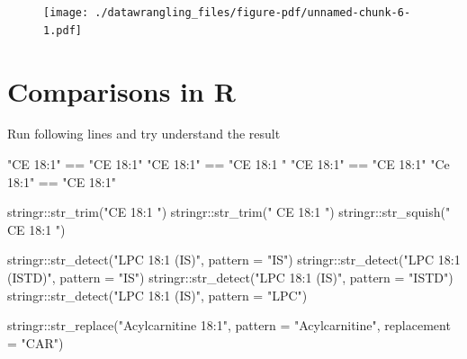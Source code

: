 \documentclass[
  letterpaper,
  DIV=11,
  numbers=noendperiod]{scrreprt}
\newenvironment{Shaded}{\begin{snugshade}}{\end{snugshade}}
\newcommand{\AttributeTok}[1]{\textcolor[rgb]{0.40,0.45,0.13}{#1}}
\newcommand{\FunctionTok}[1]{\textcolor[rgb]{0.28,0.35,0.67}{#1}}
\newcommand{\NormalTok}[1]{\textcolor[rgb]{0.00,0.23,0.31}{#1}}
\newcommand{\SpecialCharTok}[1]{\textcolor[rgb]{0.37,0.37,0.37}{#1}}
\newcommand{\StringTok}[1]{\textcolor[rgb]{0.13,0.47,0.30}{#1}}
\begin{document}
\begin{figure}[H]

{\centering \texttt{[image: ./datawrangling\_files/figure-pdf/unnamed-chunk-6-1.pdf]}

}

\end{figure}

\hypertarget{comparisons-in-r}{%
\section{Comparisons in R}\label{comparisons-in-r}}

Run following lines and try understand the result

\begin{Shaded}
\begin{Highlighting}[]
\StringTok{"CE 18:1"} \SpecialCharTok{==} \StringTok{"CE 18:1"}
\StringTok{"CE 18:1"} \SpecialCharTok{==} \StringTok{"CE 18:1 "}
\StringTok{"CE 18:1"} \SpecialCharTok{==} \StringTok{"CE  18:1"}
\StringTok{"Ce 18:1"} \SpecialCharTok{==} \StringTok{"CE 18:1"}

\NormalTok{stringr}\SpecialCharTok{::}\FunctionTok{str\_trim}\NormalTok{(}\StringTok{"CE 18:1 "}\NormalTok{)}
\NormalTok{stringr}\SpecialCharTok{::}\FunctionTok{str\_trim}\NormalTok{(}\StringTok{"   CE    18:1 "}\NormalTok{)}
\NormalTok{stringr}\SpecialCharTok{::}\FunctionTok{str\_squish}\NormalTok{(}\StringTok{"   CE    18:1 "}\NormalTok{)}

\NormalTok{stringr}\SpecialCharTok{::}\FunctionTok{str\_detect}\NormalTok{(}\StringTok{"LPC 18:1 (IS)"}\NormalTok{, }\AttributeTok{pattern =} \StringTok{"IS"}\NormalTok{)}
\NormalTok{stringr}\SpecialCharTok{::}\FunctionTok{str\_detect}\NormalTok{(}\StringTok{"LPC 18:1 (ISTD)"}\NormalTok{, }\AttributeTok{pattern =} \StringTok{"IS"}\NormalTok{)}
\NormalTok{stringr}\SpecialCharTok{::}\FunctionTok{str\_detect}\NormalTok{(}\StringTok{"LPC 18:1 (IS)"}\NormalTok{, }\AttributeTok{pattern =} \StringTok{"ISTD"}\NormalTok{)}
\NormalTok{stringr}\SpecialCharTok{::}\FunctionTok{str\_detect}\NormalTok{(}\StringTok{"LPC 18:1 (IS)"}\NormalTok{, }\AttributeTok{pattern =} \StringTok{"LPC"}\NormalTok{)}

\NormalTok{stringr}\SpecialCharTok{::}\FunctionTok{str\_replace}\NormalTok{(}\StringTok{"Acylcarnitine 18:1"}\NormalTok{, }
                     \AttributeTok{pattern =} \StringTok{"Acylcarnitine"}\NormalTok{,}
                     \AttributeTok{replacement =} \StringTok{"CAR"}\NormalTok{)}


\end{Highlighting}
\end{Shaded}
\end{document}
